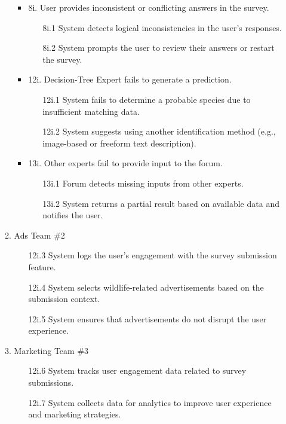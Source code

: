 \documentclass[]{article}
\begin{document}
\begin{enumerate}[{\bf BE1.}]
\begin{enumerate}[{\bf VP1.}]
\begin{itemize}
            \item 8i. User provides inconsistent or conflicting answers in the survey.
            \begin{enumerate}
                \item[8i.1] System detects logical inconsistencies in the user's responses.
                \item[8i.2] System prompts the user to review their answers or restart the survey.
            \end{enumerate}

            \item 12i. Decision-Tree Expert fails to generate a prediction.
            \begin{enumerate}
                \item[12i.1] System fails to determine a probable species due to insufficient matching data.
                \item[12i.2] System suggests using another identification method (e.g., image-based or freeform text description).
            \end{enumerate}

            \item 13i. Other experts fail to provide input to the forum.
            \begin{enumerate}
                \item[13i.1] Forum detects missing inputs from other experts.
                \item[13i.2] System returns a partial result based on available data and notifies the user.
            \end{enumerate}
        \end{itemize}
        
    \item Ads Team \#2 \\
    \begin{enumerate}
        \item [12i.3] System logs the user's engagement with the survey submission feature.
        \item [12i.4] System selects wildlife-related advertisements based on the submission context.
        \item [12i.5] System ensures that advertisements do not disrupt the user experience.
    \end{enumerate}

    \item Marketing Team \#3 \\
    \begin{enumerate}
        \item [12i.6] System tracks user engagement data related to survey submissions.
        \item [12i.7] System collects data for analytics to improve user experience and marketing strategies.
    \end{enumerate}


\end{enumerate}
\end{enumerate}
\end{document}
